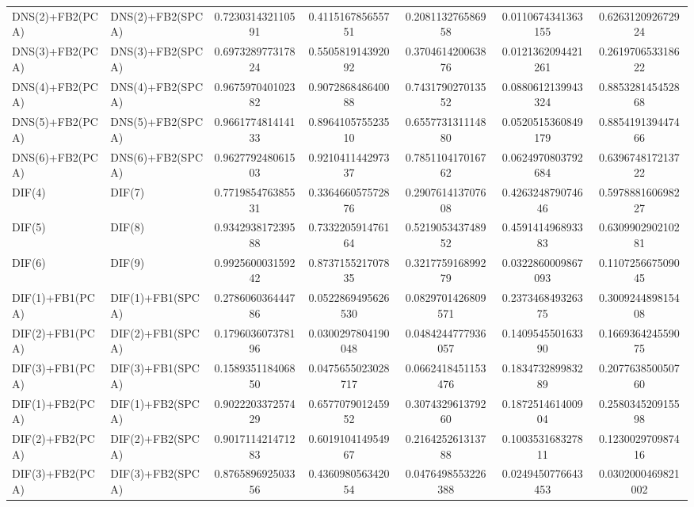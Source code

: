 \begin{table}[H]
\begin{tabular}{llSSSSS}
DNS(2)+FB2(PCA) & DNS(2)+FB2(SPCA) & 0.723031432110591 & 0.411516785655751 & 0.208113276586958 & 0.0110674341363155 & 0.626312092672924 \\ 
DNS(3)+FB2(PCA) & DNS(3)+FB2(SPCA) & 0.697328977317824 & 0.550581914392092 & 0.370461420063876 & 0.0121362094421261 & 0.261970653318622 \\ 
DNS(4)+FB2(PCA) & DNS(4)+FB2(SPCA) & 0.967597040102382 & 0.907286848640088 & 0.743179027013552 & 0.0880612139943324 & 0.885328145452868 \\ 
DNS(5)+FB2(PCA) & DNS(5)+FB2(SPCA) & 0.966177481414133 & 0.896410575523510 & 0.655773131114880 & 0.0520515360849179 & 0.885419139447466 \\ 
DNS(6)+FB2(PCA) & DNS(6)+FB2(SPCA) & 0.962779248061503 & 0.921041144297337 & 0.785110417016762 & 0.0624970803792684 & 0.639674817213722 \\ 
DIF(4) & DIF(7) & 0.771985476385531 & 0.336466057572876 & 0.290761413707608 & 0.426324879074646 & 0.597888160698227 \\ 
DIF(5) & DIF(8) & 0.934293817239588 & 0.733220591476164 & 0.521905343748952 & 0.459141496893383 & 0.630990290210281 \\ 
DIF(6) & DIF(9) & 0.992560003159242 & 0.873715521707835 & 0.321775916899279 & 0.0322860009867093 & 0.110725667509045 \\ 
DIF(1)+FB1(PCA) & DIF(1)+FB1(SPCA) & 0.278606036444786 & 0.0522869495626530 & 0.0829701426809571 & 0.237346849326375 & 0.300924489815408 \\ 
DIF(2)+FB1(PCA) & DIF(2)+FB1(SPCA) & 0.179603607378196 & 0.0300297804190048 & 0.0484244777936057 & 0.140954550163390 & 0.166936424559075 \\ 
DIF(3)+FB1(PCA) & DIF(3)+FB1(SPCA) & 0.158935118406850 & 0.0475655023028717 & 0.0662418451153476 & 0.183473289983289 & 0.207763850050760 \\ 
DIF(1)+FB2(PCA) & DIF(1)+FB2(SPCA) & 0.902220337257429 & 0.657707901245952 & 0.307432961379260 & 0.187251461400904 & 0.258034520915598 \\ 
DIF(2)+FB2(PCA) & DIF(2)+FB2(SPCA) & 0.901711421471283 & 0.601910414954967 & 0.216425261313788 & 0.100353168327811 & 0.123002970987416 \\ 
DIF(3)+FB2(PCA) & DIF(3)+FB2(SPCA) & 0.876589692503356 & 0.436098056342054 & 0.0476498553226388 & 0.0249450776643453 & 0.0302000469821002 \\ \bottomrule 
\end{tabular}
\end{table}


